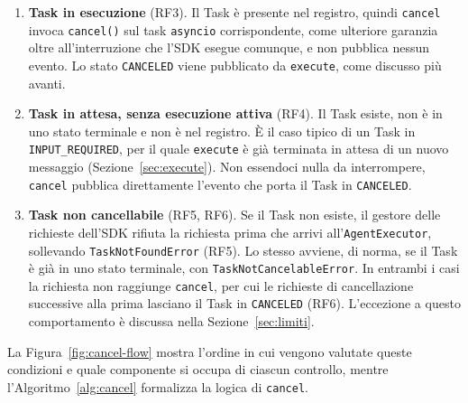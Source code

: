 \begin{enumerate}
    \item \textbf{Task in esecuzione} (RF3). Il Task è presente nel registro, quindi \texttt{cancel} invoca \texttt{cancel()} sul task \texttt{asyncio} corrispondente, come ulteriore garanzia oltre all'interruzione che l'SDK esegue comunque, e non pubblica nessun evento. Lo stato \texttt{CANCELED} viene pubblicato da \texttt{execute}, come discusso più avanti.
    \item \textbf{Task in attesa, senza esecuzione attiva} (RF4). Il Task esiste, non è in uno stato terminale e non è nel registro. È il caso tipico di un Task in \texttt{INPUT\_REQUIRED}, per il quale \texttt{execute} è già terminata in attesa di un nuovo messaggio (Sezione~\ref{sec:execute}). Non essendoci nulla da interrompere, \texttt{cancel} pubblica direttamente l'evento che porta il Task in \texttt{CANCELED}.
    \item \textbf{Task non cancellabile} (RF5, RF6). Se il Task non esiste, il gestore delle richieste dell'SDK rifiuta la richiesta prima che arrivi all'\texttt{AgentExecutor}, sollevando \texttt{TaskNotFoundError} (RF5). Lo stesso avviene, di norma, se il Task è già in uno stato terminale, con \texttt{TaskNotCancelableError}. In entrambi i casi la richiesta non raggiunge \texttt{cancel}, per cui le richieste di cancellazione successive alla prima lasciano il Task in \texttt{CANCELED} (RF6). L'eccezione a questo comportamento è discussa nella Sezione~\ref{sec:limiti}.
\end{enumerate}

La Figura~\ref{fig:cancel-flow} mostra l'ordine in cui vengono valutate queste condizioni e quale componente si occupa di ciascun controllo, mentre l'Algoritmo~\ref{alg:cancel} formalizza la logica di \texttt{cancel}.

